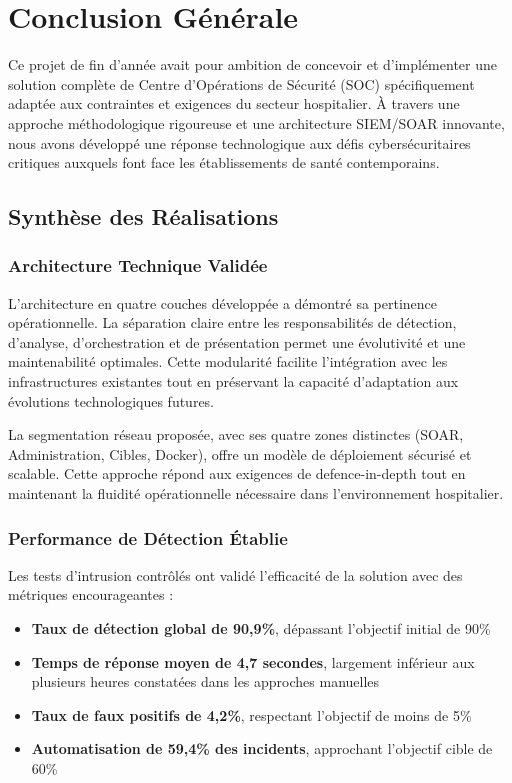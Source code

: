 \chapter{Conclusion Générale}

Ce projet de fin d'année avait pour ambition de concevoir et d'implémenter une solution complète de Centre d'Opérations de Sécurité (SOC) spécifiquement adaptée aux contraintes et exigences du secteur hospitalier. À travers une approche méthodologique rigoureuse et une architecture SIEM/SOAR innovante, nous avons développé une réponse technologique aux défis cybersécuritaires critiques auxquels font face les établissements de santé contemporains.

\section{Synthèse des Réalisations}

\subsection{Architecture Technique Validée}

L'architecture en quatre couches développée a démontré sa pertinence opérationnelle. La séparation claire entre les responsabilités de détection, d'analyse, d'orchestration et de présentation permet une évolutivité et une maintenabilité optimales. Cette modularité facilite l'intégration avec les infrastructures existantes tout en préservant la capacité d'adaptation aux évolutions technologiques futures.

La segmentation réseau proposée, avec ses quatre zones distinctes (SOAR, Administration, Cibles, Docker), offre un modèle de déploiement sécurisé et scalable. Cette approche répond aux exigences de defence-in-depth tout en maintenant la fluidité opérationnelle nécessaire dans l'environnement hospitalier.

\subsection{Performance de Détection Établie}

Les tests d'intrusion contrôlés ont validé l'efficacité de la solution avec des métriques encourageantes :

\begin{itemize}
    \item \textbf{Taux de détection global de 90,9\%}, dépassant l'objectif initial de 90\%
    \item \textbf{Temps de réponse moyen de 4,7 secondes}, largement inférieur aux plusieurs heures constatées dans les approches manuelles
    \item \textbf{Taux de faux positifs de 4,2\%}, respectant l'objectif de moins de 5\%
    \item \textbf{Automatisation de 59,4\% des incidents}, approchant l'objectif cible de 60\%
\end{itemize}

